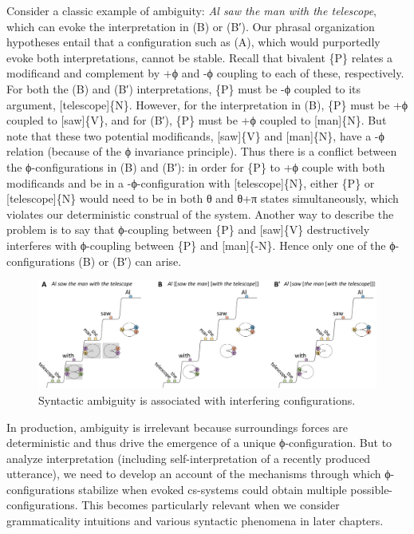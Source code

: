   Consider a classic example of ambiguity: \textit{Al saw the man with the telescope}, which can evoke the interpretation in {}(B) or (B′). Our phrasal organization hypotheses entail that a configuration such as (A), which would purportedly evoke both interpretations, cannot be stable. Recall that bivalent \{P\} relates a modificand and complement by +ϕ and -ϕ coupling to each of these, respectively. For both the (B) and (B′) interpretations, \{P\} must be -ϕ coupled to its argument, [telescope]\{N\}. However, for the interpretation in (B), \{P\} must be +ϕ coupled to [saw]\{V\}, and for (B′), \{P\} must be +ϕ coupled to [man]\{N\}. But note that these two potential modificands, [saw]\{V\} and [man]\{N\}, have a -ϕ relation (because of the ϕ invariance principle). Thus there is a conflict between the ϕ-configurations in (B) and (B′): in order for \{P\} to +ϕ couple with both modificands and be in a -ϕ-configuration with [telescope]\{N\}, either \{P\} or [telescope]\{N\} would need to be in both θ and θ+π states simultaneously, which violates our deterministic construal of the system. Another way to describe the problem is to say that ϕ-coupling between \{P\} and [saw]\{V\} destructively interferes with ϕ-coupling between \{P\} and [man]\{-N\}. Hence only one of the ϕ-configurations (B) or (B′) can arise.

  
\begin{figure}
\includegraphics[width=\textwidth]{figures/Tilsen-img89.png}
\caption{Syntactic ambiguity is associated with interfering configurations.}
\label{fig:4:39}
\end{figure}
 

  In production, ambiguity is irrelevant because surroundings forces are deterministic and thus drive the emergence of a unique ϕ-configuration. But to analyze interpretation (including self-interpretation of a recently produced utterance), we need to develop an account of the mechanisms through which ϕ-configurations stabilize when evoked cs-systems could obtain multiple possible-configurations. This becomes particularly relevant when we consider grammaticality intuitions and various syntactic phenomena in later chapters.


